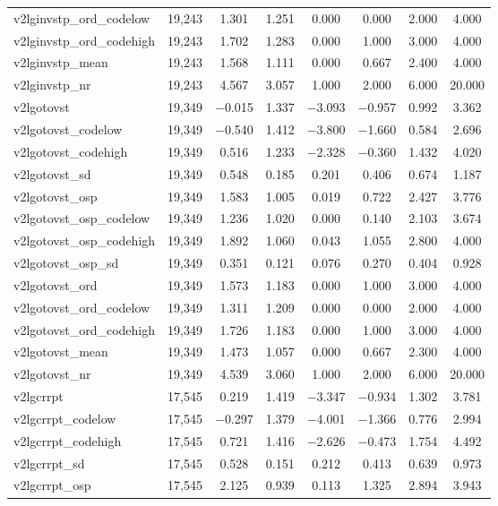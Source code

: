\begin{table}[!htbp]
\begin{tabular}{@{\extracolsep{5pt}}lccccccc}
v2lginvstp\_ord\_codelow & 19,243 & 1.301 & 1.251 & 0.000 & 0.000 & 2.000 & 4.000 \\ 
v2lginvstp\_ord\_codehigh & 19,243 & 1.702 & 1.283 & 0.000 & 1.000 & 3.000 & 4.000 \\ 
v2lginvstp\_mean & 19,243 & 1.568 & 1.111 & 0.000 & 0.667 & 2.400 & 4.000 \\ 
v2lginvstp\_nr & 19,243 & 4.567 & 3.057 & 1.000 & 2.000 & 6.000 & 20.000 \\ 
v2lgotovst & 19,349 & $-$0.015 & 1.337 & $-$3.093 & $-$0.957 & 0.992 & 3.362 \\ 
v2lgotovst\_codelow & 19,349 & $-$0.540 & 1.412 & $-$3.800 & $-$1.660 & 0.584 & 2.696 \\ 
v2lgotovst\_codehigh & 19,349 & 0.516 & 1.233 & $-$2.328 & $-$0.360 & 1.432 & 4.020 \\ 
v2lgotovst\_sd & 19,349 & 0.548 & 0.185 & 0.201 & 0.406 & 0.674 & 1.187 \\ 
v2lgotovst\_osp & 19,349 & 1.583 & 1.005 & 0.019 & 0.722 & 2.427 & 3.776 \\ 
v2lgotovst\_osp\_codelow & 19,349 & 1.236 & 1.020 & 0.000 & 0.140 & 2.103 & 3.674 \\ 
v2lgotovst\_osp\_codehigh & 19,349 & 1.892 & 1.060 & 0.043 & 1.055 & 2.800 & 4.000 \\ 
v2lgotovst\_osp\_sd & 19,349 & 0.351 & 0.121 & 0.076 & 0.270 & 0.404 & 0.928 \\ 
v2lgotovst\_ord & 19,349 & 1.573 & 1.183 & 0.000 & 1.000 & 3.000 & 4.000 \\ 
v2lgotovst\_ord\_codelow & 19,349 & 1.311 & 1.209 & 0.000 & 0.000 & 2.000 & 4.000 \\ 
v2lgotovst\_ord\_codehigh & 19,349 & 1.726 & 1.183 & 0.000 & 1.000 & 3.000 & 4.000 \\ 
v2lgotovst\_mean & 19,349 & 1.473 & 1.057 & 0.000 & 0.667 & 2.300 & 4.000 \\ 
v2lgotovst\_nr & 19,349 & 4.539 & 3.060 & 1.000 & 2.000 & 6.000 & 20.000 \\ 
v2lgcrrpt & 17,545 & 0.219 & 1.419 & $-$3.347 & $-$0.934 & 1.302 & 3.781 \\ 
v2lgcrrpt\_codelow & 17,545 & $-$0.297 & 1.379 & $-$4.001 & $-$1.366 & 0.776 & 2.994 \\ 
v2lgcrrpt\_codehigh & 17,545 & 0.721 & 1.416 & $-$2.626 & $-$0.473 & 1.754 & 4.492 \\ 
v2lgcrrpt\_sd & 17,545 & 0.528 & 0.151 & 0.212 & 0.413 & 0.639 & 0.973 \\ 
v2lgcrrpt\_osp & 17,545 & 2.125 & 0.939 & 0.113 & 1.325 & 2.894 & 3.943 \\ 

\end{tabular}
\end{table}
